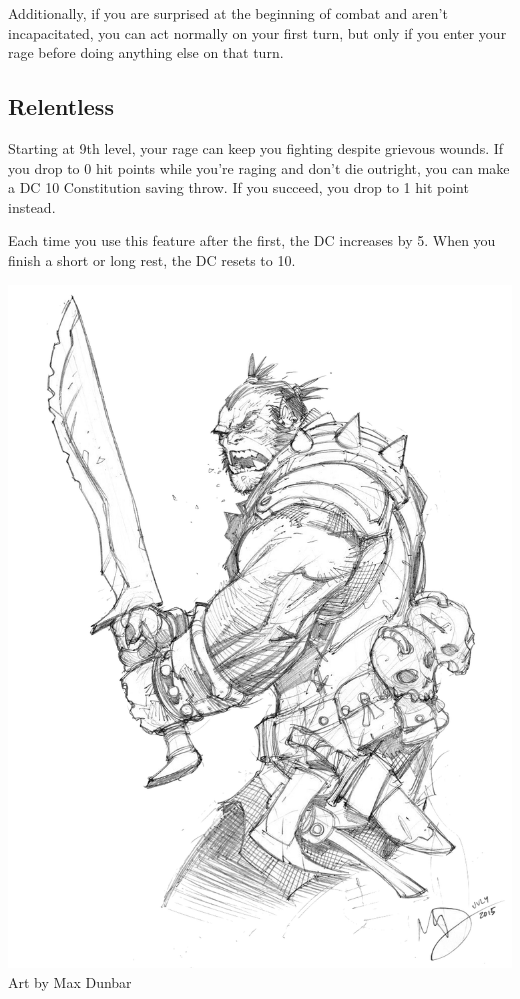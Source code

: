 \begin{multicols*}{2}
Additionally, if you are surprised at the beginning of combat and aren’t incapacitated, you can act normally on your first turn, but only if you enter your rage before doing anything else on that turn.

\subsection*{Relentless}

Starting at 9th level, your rage can keep you fighting despite grievous wounds. If you drop to 0 hit points while you’re raging and don’t die outright, you can make a DC 10 Constitution saving throw. If you succeed, you drop to 1 hit point instead.

Each time you use this feature after the first, the DC increases by 5. When you finish a short or long rest, the DC resets to 10.


\begin{Figure}
\centering
\includegraphics[width=\textwidth]{img/barbarian-half-orc.png}
{\scriptsize Art by Max Dunbar}
\end{Figure}
    
\end{multicols*}